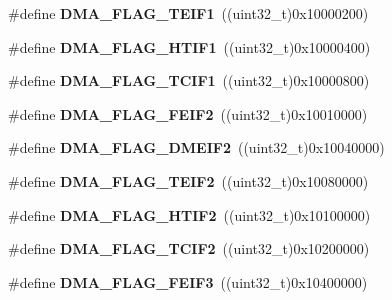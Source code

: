 \begin{DoxyCompactItemize}
\#define {\bfseries D\+M\+A\+\_\+\+F\+L\+A\+G\+\_\+\+T\+E\+I\+F1}~((uint32\+\_\+t)0x10000200)
\item 
\mbox{\label{group___d_m_a__flags__definition_ga5e00b692cb6654c1e09f091e4dba807c}} 
\#define {\bfseries D\+M\+A\+\_\+\+F\+L\+A\+G\+\_\+\+H\+T\+I\+F1}~((uint32\+\_\+t)0x10000400)
\item 
\mbox{\label{group___d_m_a__flags__definition_ga4ec37900b79b667829eced7b442f2c9d}} 
\#define {\bfseries D\+M\+A\+\_\+\+F\+L\+A\+G\+\_\+\+T\+C\+I\+F1}~((uint32\+\_\+t)0x10000800)
\item 
\mbox{\label{group___d_m_a__flags__definition_ga3e7dfaf220ad350a2b0a3d307ba8896e}} 
\#define {\bfseries D\+M\+A\+\_\+\+F\+L\+A\+G\+\_\+\+F\+E\+I\+F2}~((uint32\+\_\+t)0x10010000)
\item 
\mbox{\label{group___d_m_a__flags__definition_ga69b110e9d83d45faf6e88719cff8f721}} 
\#define {\bfseries D\+M\+A\+\_\+\+F\+L\+A\+G\+\_\+\+D\+M\+E\+I\+F2}~((uint32\+\_\+t)0x10040000)
\item 
\mbox{\label{group___d_m_a__flags__definition_gaa3e1e5d2a043496524107ecc1ddfe934}} 
\#define {\bfseries D\+M\+A\+\_\+\+F\+L\+A\+G\+\_\+\+T\+E\+I\+F2}~((uint32\+\_\+t)0x10080000)
\item 
\mbox{\label{group___d_m_a__flags__definition_gae960d87b7770ec11820df758fecf28db}} 
\#define {\bfseries D\+M\+A\+\_\+\+F\+L\+A\+G\+\_\+\+H\+T\+I\+F2}~((uint32\+\_\+t)0x10100000)
\item 
\mbox{\label{group___d_m_a__flags__definition_ga26c60c0cd9f24112eb082c7bbba1eff7}} 
\#define {\bfseries D\+M\+A\+\_\+\+F\+L\+A\+G\+\_\+\+T\+C\+I\+F2}~((uint32\+\_\+t)0x10200000)
\item 
\mbox{\label{group___d_m_a__flags__definition_ga7d551a54c46071ea3629d38768cd8638}} 
\#define {\bfseries D\+M\+A\+\_\+\+F\+L\+A\+G\+\_\+\+F\+E\+I\+F3}~((uint32\+\_\+t)0x10400000)
\item 
\mbox{\label{group___d_m_a__flags__definition_gacb835761b58d15662b0e631697bbf0a4}} 

\end{DoxyCompactItemize}
